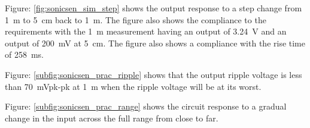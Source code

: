 Figure: \ref{fig:sonicsen_sim_step} shows the output response to a step change from \SI{1}{\meter} to \SI{5}{\centi\meter} back to \SI{1}{\meter}. The figure also shows the compliance to the requirements with the \SI{1}{\meter} measurement having an output of \SI{3.24}{\volt} and an output of \SI{200}{\milli\volt} at \SI{5}{\centi\meter}. The figure also shows a compliance with the rise time of \SI{258}{\milli\second}.

Figure: \ref{subfig:sonicsen_prac_ripple} shows that the output ripple voltage is less than \SI{70}{\milli\volt}pk-pk at \SI{1}{\meter} when the ripple voltage will be at its worst.

Figure: \ref{subfig:sonicsen_prac_range} shows the circuit response to a gradual change in the input across the full range from close to far.

